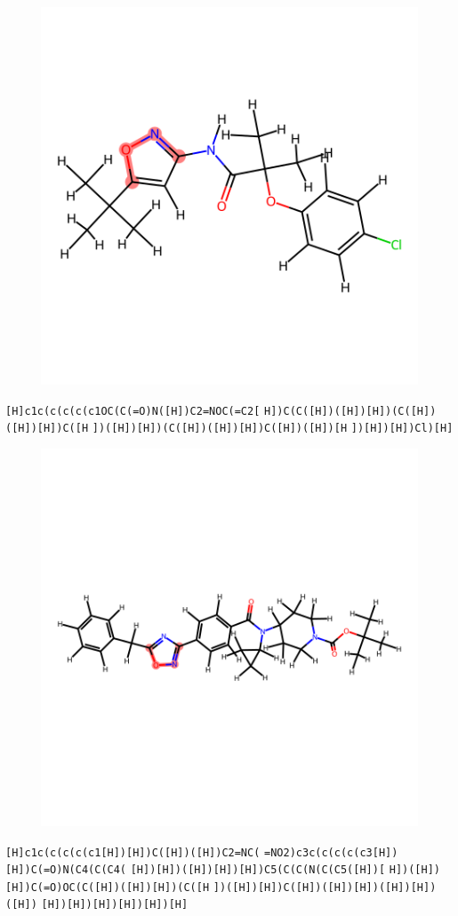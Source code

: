 \documentclass{article}
\begin{document}
\begin{figure}[ht]
\centering
    \includegraphics{mol104.png}
\end{figure}
\verb|[H]c1c(c(c(c(c1OC(C(=O)N([H])C2=NOC(=C2[| \verb|H])C(C([H])([H])[H])(C([H])([H])[H])C([H| \verb|])([H])[H])(C([H])([H])[H])C([H])([H])[H| \verb|])[H])[H])Cl)[H]|

\begin{figure}[ht]
\centering
    \includegraphics{mol105.png}
\end{figure}
\verb|[H]c1c(c(c(c(c1[H])[H])C([H])([H])C2=NC(| \verb|=NO2)c3c(c(c(c(c3[H])[H])C(=O)N(C4(C(C4(| \verb|[H])[H])([H])[H])[H])C5(C(C(N(C(C5([H])[| \verb|H])([H])[H])C(=O)OC(C([H])([H])[H])(C([H| \verb|])([H])[H])C([H])([H])[H])([H])[H])([H])| \verb|[H])[H])[H])[H])[H])[H]|
\end{document}
